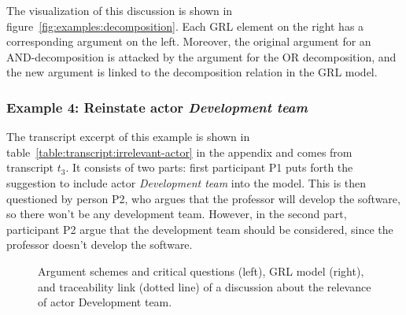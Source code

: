 The visualization of this discussion is shown in figure~\ref{fig:examples:decomposition}. Each GRL element on the right has a corresponding argument on the left. Moreover, the original argument for an AND-decomposition is attacked by the argument for the OR decomposition, and the new argument is linked to the decomposition relation in the GRL model.

\subsubsection{Example 4: Reinstate actor \emph{Development team}}

The transcript excerpt of this example is shown in table~\ref{table:transcript:irrelevant-actor} in the appendix and comes from transcript $t_3$. It consists of two parts: first participant P1 puts forth the suggestion to include actor \emph{Development team} into the model. This is then questioned by person P2, who argues that the professor will develop the software, so there won't be any development team. However, in the second part, participant P2 argue that the development team should be considered, since the professor doesn't develop the software.

\begin{figure}[ht!]
\centering
\caption{Argument schemes and critical questions (left), GRL model (right), and traceability link (dotted line) of a discussion about the relevance of actor Development team.}
\label{fig:examples:relevant-actor}
\end{figure}

